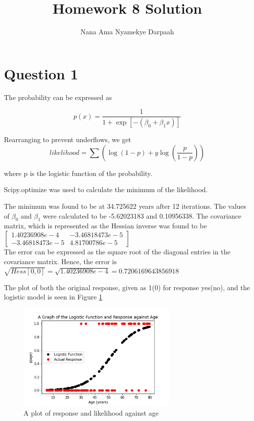 \documentclass[11pt]{article}
\title{Homework 8 Solution}
\author{Nana Ama Nyamekye Darpaah}
\begin{document}
	
	\maketitle
	\section{Question 1}
	The probability can be expressed as 
	
	\begin{equation}
		p(x) = \frac{1}{1 + \exp[-(\beta_{0}+\beta_{1}x)]}
	\end{equation}

	Rearranging to prevent underflows, we get
	\begin{equation}
		likelihood = \sum(\log(1-p)+y\log(\frac{p}{1-p}))
	\end{equation}
	
	where p is the logistic function of the probability.
	
	Scipy.optimize was used to calculate the minimum of the likelihood.
	
	The minimum was found to be at 34.725622 years after 12 iterations. The values of $\beta_{0}$ and $\beta_{1}$ were calculated to be -5.62023183 and 0.10956338. The covariance matrix, which is represented as the Hessian inverse was found to be \\
	
$	\begin{bmatrix}
		1.40236908e-4 & -3.46818473e-5\\
		-3.46818473e-5 & 4.81700786e-5
	\end{bmatrix}$
\\
The error can be expressed as the square root of the diagonal entries in the covariance matrix. Hence, the error is
	$\sqrt{Hess[0,0]} = \sqrt{1.40236908e-4} = 0.7206169643856918$
	
	The plot of both the original response, given as 1(0) for response yes(no), and the logistic model is seen in Figure \ref{fig:likelihood}
	
	\begin{figure}[!htb]\begin{center} 
			\vspace{12pt}
			\includegraphics[width=0.7\textwidth]{Likelihood.png}
			\caption{A plot of response and likelihood against age}
			\label{fig:likelihood} 
		\end{center}
	\end{figure}
	
\end{document}
